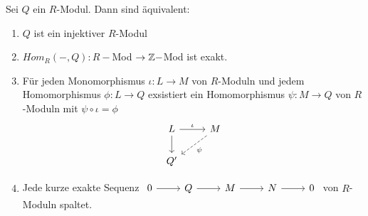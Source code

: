 \begin{sa}
	Sei $Q$ ein $R$-Modul. Dann sind äquivalent:
	\begin{enumerate} [label= \roman*)]
		\item $Q$ ist ein injektiver $R$-Modul 
		\item $Hom_{R}(-,Q): R-$Mod $\to \mathbb{Z}-$Mod ist exakt.
		\item Für jeden Monomorphismus $\iota: L \to M $ von $R$-Moduln und jedem Homomorphismus $\phi: L \to Q $ exsistiert ein Homomorphismus $\psi: M \to Q $ von $R$-Moduln  mit $ \psi \circ \iota = \phi $
		$$\begin{tikzcd}
		L \arrow{r} {\iota} \arrow{d}& M \arrow[dashed]{dl}{\psi} \\
		Q' &
		\end{tikzcd}
		$$
		\item Jede kurze exakte Sequenz $\begin{tikzcd}
		0  \arrow{r} & Q \arrow{r} & M \arrow{r} & N \arrow{r} & 0
		\end{tikzcd} $ von $R$-Moduln spaltet.
	\end{enumerate}
\end{sa}

